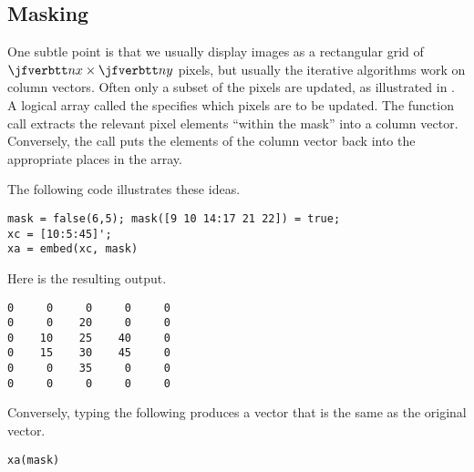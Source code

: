 
\subsection{Masking}

One subtle point is that we usually display images
as a rectangular grid of $\ty{nx} \times \ty{ny}$ pixels,
but usually the iterative algorithms
work on column vectors.
Often only a subset of the pixels are updated,
as illustrated in
.
A logical array called the 
specifies which pixels are to be updated.
The function call
extracts the relevant pixel elements
``within the mask''
into a column vector.
Conversely, the call
puts the elements of the column vector
back into the appropriate places
in the array.

\newcommand{\fdir}{book/c-reg/fig}

The following code illustrates these ideas.

\begin{verbatim}
mask = false(6,5); mask([9 10 14:17 21 22]) = true;
xc = [10:5:45]';
xa = embed(xc, mask)
\end{verbatim}

\noindent
Here is the resulting output.

\begin{verbatim}
0     0     0     0     0
0     0    20     0     0
0    10    25    40     0
0    15    30    45     0
0     0    35     0     0
0     0     0     0     0
\end{verbatim}

\noindent
Conversely,
typing the following
produces a vector that is the same as the original  vector.
\begin{verbatim}
xa(mask)
\end{verbatim}
